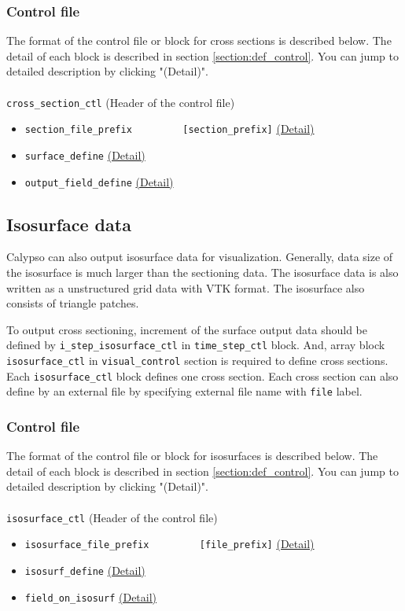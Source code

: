 \subsubsection{Control file}
The format of the control file or block for cross sections is described below. The detail of each block is described in section \ref{section:def_control}. You can jump to detailed description by clicking "(Detail)". \\
\\
%
\verb|cross_section_ctl|  (Header of the control file)
\label{href_i:cross_section_ctl}
\begin{itemize}
	\item \verb|section_file_prefix         [section_prefix]|
    		\hyperref[href_t:section_file_prefix]{(Detail)}
	\item \verb|surface_define|
    		\hyperref[href_t:surface_define]{(Detail)}
	\item \verb|output_field_define|
    		\hyperref[href_t:output_field_define]{(Detail)}
\end{itemize}

%
\subsection{Isosurface data}
%
Calypso can also output isosurface data for visualization. Generally, data size of the isosurface is much larger than the sectioning data. The isosurface data is also written as a unstructured grid data with VTK format. The isosurface also consists of triangle patches.

To output cross sectioning, increment of the surface output data should be defined by \verb|i_step_isosurface_ctl| in \verb|time_step_ctl| block. And, array block \verb|isosurface_ctl| in \verb|visual_control| section is required to define cross sections. Each \verb|isosurface_ctl| block defines one cross section. Each cross section can also define by an external file by specifying external file name with \verb|file| label.
%
\subsubsection{Control file}
The format of the control file or block for isosurfaces is described below. The detail of each block is described in section \ref{section:def_control}. You can jump to detailed description by clicking "(Detail)". \\
\\
%
\verb|isosurface_ctl|  (Header of the control file)
\label{href_i:isosurface_ctl}
\begin{itemize}
	\item \verb|isosurface_file_prefix         [file_prefix]|
    		\hyperref[href_t:isosurface_file_prefix]{(Detail)}
	\item \verb|isosurf_define|
    		\hyperref[href_t:isosurf_define]{(Detail)}
	\item \verb|field_on_isosurf|
    		\hyperref[href_t:field_on_isosurf]{(Detail)}
\end{itemize}



